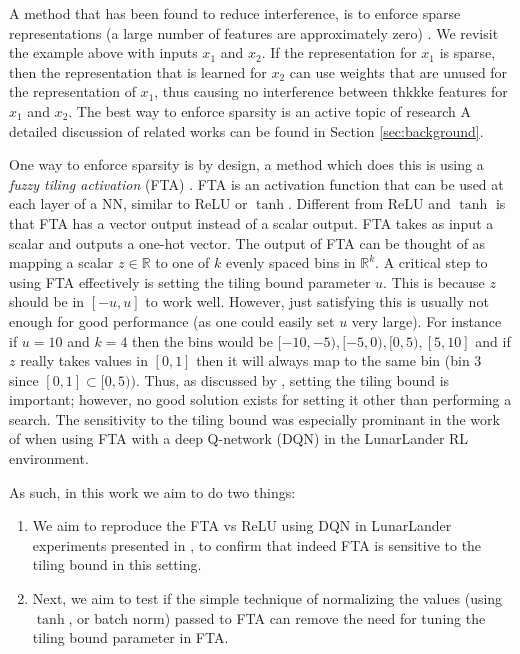 \documentclass{article}
\newcommand{\RR}{\mathbb{R}}
\begin{document}
A method that has been found to reduce interference, is to enforce sparse representations (a large number of features are approximately zero) \cite[]{liu2019,javed2019,rafati2019learning}.
We revisit the example above with inputs $x_1$ and $x_2$.
If the representation for $x_1$ is sparse, then the representation that is learned for $x_2$ can use weights that are unused for the representation of $x_1$, 
thus causing no interference between thkkke features for $x_1$ and $x_2$.
The best way to enforce sparsity is an active topic of research 
A detailed discussion of related works can be found in Section \ref{sec:background}.

One way to enforce sparsity is by design, a method which does this is using a \textit{fuzzy tiling activation} (FTA) \cite[]{pan2019fuzzy}.
FTA is an activation function that can be used at each layer of a NN, similar to ReLU or $\tanh$.
Different from ReLU and $\tanh$ is that FTA has a vector output instead of a scalar output.
FTA takes as input a scalar and outputs a one-hot vector.
The output of FTA can be thought of as mapping a scalar $z \in \RR$ to one of $k$ evenly spaced bins in $\RR^k$.
A critical step to using FTA effectively is setting the tiling bound parameter $u$.
This is because $z$ should be in $[-u, u]$ to work well. 
However, just satisfying this is usually not enough for good performance (as one could easily set $u$ very large).
For instance if $u = 10$ and $k = 4$ then the bins would be $[-10, -5), [-5, 0), [0, 5), [5, 10]$ 
and if $z$ really takes values in $[0,1]$ then it will always map to the same bin (bin $3$ since $[0, 1] \subset [0, 5))$.
Thus, as discussed by \cite[]{pan2019fuzzy}, setting the tiling bound is important; however, no good solution exists for setting it other than performing a search.
The sensitivity to the tiling bound was especially prominant in the work of \cite[]{pan2019fuzzy} when using FTA with a deep Q-network (DQN) \cite[]{mnih2013playing} in the LunarLander RL environment.

As such, in this work we aim to do two things:
\begin{enumerate}
  \item We aim to reproduce the FTA vs ReLU using DQN in LunarLander experiments presented in \cite[]{pan2019fuzzy}, to confirm that indeed FTA is sensitive to the tiling bound in this setting.
  \item Next, we aim to test if the simple technique of normalizing the values (using $\tanh$, or batch norm) passed to FTA can remove the need for tuning the tiling bound parameter in FTA.
\end{enumerate}
\end{document}
